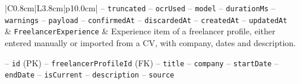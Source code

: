 \begin{center}
\begin{longtable}{|C{0.8cm}|L{3.8cm}|p{10.0cm}|}
\hspace*{1em}-- \texttt{truncated} \newline
\hspace*{1em}-- \texttt{ocr\allowbreak Used} \newline
\hspace*{1em}-- \texttt{model} \newline
\hspace*{1em}-- \texttt{duration\allowbreak Ms} \newline
\hspace*{1em}-- \texttt{warnings} \newline
\hspace*{1em}-- \texttt{payload} \newline
\hspace*{1em}-- \texttt{confirmed\allowbreak At} \newline
\hspace*{1em}-- \texttt{discarded\allowbreak At} \newline
\hspace*{1em}-- \texttt{created\allowbreak At} \newline
\hspace*{1em}-- \texttt{updated\allowbreak At} \\
 & \texttt{Freelancer\allowbreak Experience} & Experience item of a freelancer profile, either entered manually or imported from a CV, with company, dates and description.\par\smallskip
\hspace*{1em}-- \texttt{id} (PK) \newline
\hspace*{1em}-- \texttt{freelancer\allowbreak Profile\allowbreak Id} (FK) \newline
\hspace*{1em}-- \texttt{title} \newline
\hspace*{1em}-- \texttt{company} \newline
\hspace*{1em}-- \texttt{start\allowbreak Date} \newline
\hspace*{1em}-- \texttt{end\allowbreak Date} \newline
\hspace*{1em}-- \texttt{is\allowbreak Current} \newline
\hspace*{1em}-- \texttt{description} \newline
\hspace*{1em}-- \texttt{source} \newline

\end{longtable}
\end{center}
